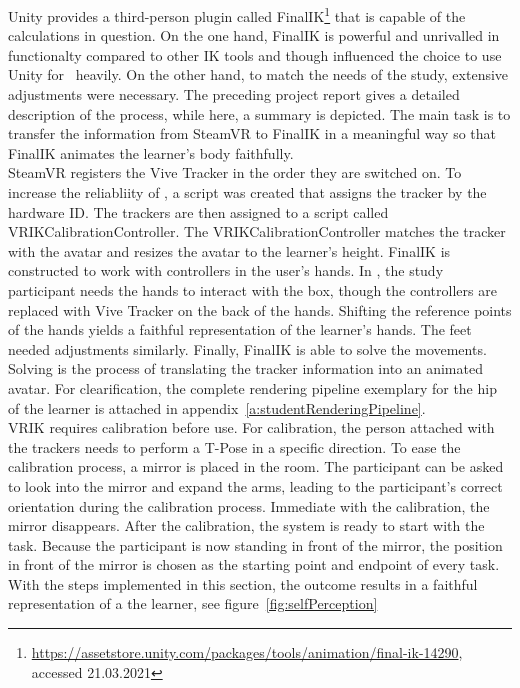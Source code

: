 Unity provides a third-person plugin called FinalIK\footnote{\href{https://assetstore.unity.com/packages/tools/animation/final-ik-14290}{https://assetstore.unity.com/packages/tools/animation/final-ik-14290}, accessed 21.03.2021} that is capable of the calculations in question. On the one hand, FinalIK is powerful and unrivalled in functionalty compared to other IK tools and though influenced the choice to use Unity for \exgo\ heavily. On the other hand, to match the needs of the study, extensive adjustments were necessary. The preceding project report gives a detailed description of the process, while here, a summary is depicted. The main task is to transfer the information from SteamVR to FinalIK in a meaningful way so that FinalIK animates the learner's body faithfully.\\
SteamVR registers the Vive Tracker in the order they are switched on. To increase the reliabliity of \exgo, a script was created that assigns the tracker by the hardware ID. The trackers are then assigned to a script called VRIKCalibrationController. The VRIKCalibrationController matches the tracker with the avatar and resizes the avatar to the learner's height. FinalIK is constructed to work with controllers in the user's hands. In \exgo, the study participant needs the hands to interact with the box, though the controllers are replaced with Vive Tracker on the back of the hands. Shifting the reference points of the hands yields a faithful representation of the learner's hands. The feet needed adjustments similarly. Finally, FinalIK is able to solve the movements. Solving is the process of translating the tracker information into an animated avatar. For clearification, the complete rendering pipeline exemplary for the hip of the learner is attached in appendix~\ref{a:studentRenderingPipeline}.\\
VRIK requires calibration before use. For calibration, the person attached with the trackers needs to perform a T-Pose in a specific direction. To ease the calibration process, a mirror is placed in the room. The participant can be asked to look into the mirror and expand the arms, leading to the participant's correct orientation during the calibration process. Immediate with the calibration, the mirror disappears.
After the calibration, the system is ready to start with the task. Because the participant is now standing in front of the mirror, the position in front of the mirror is chosen as the starting point and endpoint of every task.\\
With the steps implemented in this section, the outcome results in a faithful representation of a the learner, see figure~\ref{fig:selfPerception}

